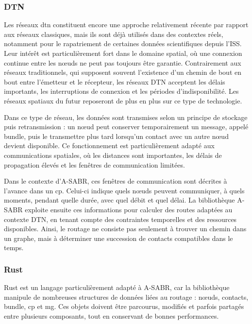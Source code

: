 \documentclass{article}
\begin{document}
\subsubsection{DTN}
Les réseaux \gls{dtn} constituent encore une approche relativement récente par rapport aux réseaux classiques, mais ils sont déjà utilisés dans des contextes réels, notamment pour le rapatriement de certaines données scientifiques depuis l'ISS. Leur intérêt est particulièrement fort dans le domaine spatial, où une connexion continue entre les nœuds ne peut pas toujours être garantie. Contrairement aux réseaux traditionnels, qui supposent souvent l'existence d'un chemin de bout en bout entre l'émetteur et le récepteur, les réseaux DTN acceptent les délais importants, les interruptions de connexion et les périodes d'indisponibilité. Les réseaux spatiaux du futur reposeront de plus en plus sur ce type de technologie.

Dans ce type de réseau, les données sont transmises selon un principe de stockage puis retransmission : un nœud peut conserver temporairement un message, appelé \gls{bundle}, puis le transmettre plus tard lorsqu’un contact avec un autre nœud devient disponible. Ce fonctionnement est particulièrement adapté aux communications spatiales, où les distances sont importantes, les délais de propagation élevés et les fenêtres de communication limitées.

Dans le contexte d’A-SABR, ces fenêtres de communication sont décrites à l’avance dans un \gls{cp}. Celui-ci indique quels nœuds peuvent communiquer, à quels moments, pendant quelle durée, avec quel débit et quel délai. La bibliothèque A-SABR exploite ensuite ces informations pour calculer des routes adaptées au contexte DTN, en tenant compte des contraintes temporelles et des ressources disponibles. Ainsi, le routage ne consiste pas seulement à trouver un chemin dans un graphe, mais à déterminer une succession de contacts compatibles dans le temps.

\subsubsection{Rust}

Rust est un langage particulièrement adapté à A-SABR, car la bibliothèque manipule de nombreuses structures de données liées au routage : nœuds, contacts, \gls{bundle}, \gls{cp} et \gls{mg}. Ces objets doivent être parcourus, modifiés et parfois partagés entre plusieurs composants, tout en conservant de bonnes performances.
\end{document}
